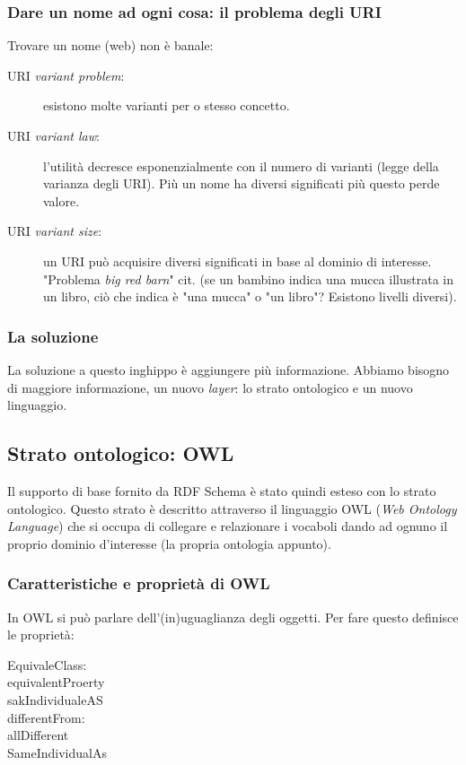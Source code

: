 			\subsubsection{Dare un nome ad ogni cosa: il problema degli URI}
				Trovare un nome (web) non è banale:
				\begin{description}
					\item[URI \emph{variant problem}:] esistono molte varianti per o stesso concetto.
					\item[URI \emph{variant law}:] l'utilità decresce esponenzialmente con il numero di varianti (legge della varianza degli URI). Più un nome ha diversi significati più questo perde valore.
					\item[URI \emph{variant size}:] un URI può acquisire diversi significati in base al dominio di interesse. "Problema \emph{big red barn}" cit. (se un bambino indica una mucca illustrata in un libro, ciò che indica è "una mucca" o "un libro"? Esistono livelli diversi).
				\end{description}				
			
			\subsubsection{La soluzione}
				La soluzione a questo inghippo è aggiungere più informazione. Abbiamo bisogno di maggiore informazione, un nuovo \emph{layer}: lo strato ontologico e un nuovo linguaggio.
		
		\subsection{Strato ontologico: OWL}
			Il supporto di base fornito da RDF Schema è stato quindi esteso con lo strato ontologico. Questo strato è descritto attraverso il linguaggio OWL (\emph{Web Ontology Language}) che si occupa di collegare e relazionare i vocaboli dando ad ognuno il proprio dominio d'interesse (la propria ontologia appunto).
		
			\subsubsection{Caratteristiche e proprietà di OWL}
				In OWL si può parlare dell'(in)uguaglianza degli oggetti. Per fare questo definisce le proprietà:
					\begin{description}
						\item[EquivaleClass:]
						\item[equivalentProerty]
						\item[sakIndividualeAS]
						\item[differentFrom:]
						\item[allDifferent]
						\item[SameIndividualAs]
					\end{description}
					

